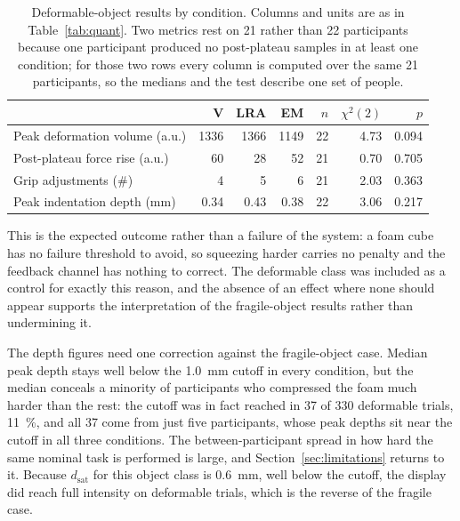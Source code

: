 \documentclass[12pt, a4paper, twoside, openright]{report}
\begin{document}
\begin{table}[ht]
    \centering
    \caption{Deformable-object results by condition. Columns and units are as in
        Table~\ref{tab:quant}. Two metrics rest on 21 rather than 22 participants
        because one participant produced no post-plateau samples in at least one
        condition; for those two rows every column is computed over the same 21
        participants, so the medians and the test describe one set of people.}
    \label{tab:deformable}
    \begin{tabular}{@{}lrrrrrr@{}}
        \toprule
                                       & V    & LRA  & EM   & $n$ & $\chi^2(2)$ & $p$   \\
        \midrule
        Peak deformation volume (a.u.) & 1336 & 1366 & 1149 & 22  & 4.73        & 0.094 \\
        Post-plateau force rise (a.u.) & 60   & 28   & 52   & 21  & 0.70        & 0.705 \\
        Grip adjustments (\#)          & 4    & 5    & 6    & 21  & 2.03        & 0.363 \\
        Peak indentation depth (mm)    & 0.34 & 0.43 & 0.38 & 22  & 3.06        & 0.217 \\
        \bottomrule
    \end{tabular}
\end{table}

This is the expected outcome rather than a failure of the system: a foam cube
has no failure threshold to avoid, so squeezing harder carries no penalty and
the feedback channel has nothing to correct. The deformable class was included
as a control for exactly this reason, and the absence of an effect where none
should appear supports the interpretation of the fragile-object results rather
than undermining it.

The depth figures need one correction against the fragile-object case. Median
peak depth stays well below the \SI{1.0}{\milli\metre} cutoff in every
condition, but the median conceals a minority of participants who compressed
the foam much harder than the rest: the cutoff was in fact reached in 37 of 330
deformable trials, \SI{11}{\percent}, and all 37 come from just five
participants, whose peak depths sit near the cutoff in all three conditions. The between-participant
spread in how hard the same nominal task is performed is large, and
Section~\ref{sec:limitations} returns to it. Because $d_{\text{sat}}$ for this
object class is \SI{0.6}{\milli\metre}, well below the cutoff, the display
did reach full intensity on deformable trials, which is the reverse of the
fragile case.
\end{document}
